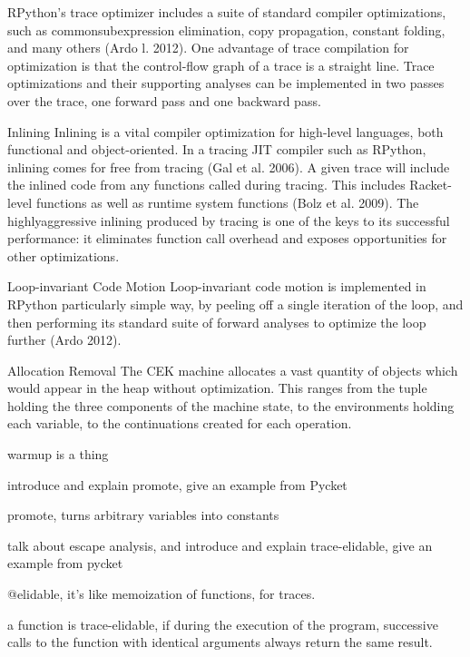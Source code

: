 RPython’s trace optimizer includes a suite of standard compiler optimizations, such as commonsubexpression elimination, copy propagation, constant folding, and many others (Ardo l. 2012). One advantage of trace compilation for optimization is that the control-flow graph of a trace is a straight line. Trace optimizations and their supporting analyses can be implemented in two passes over the trace, one forward pass and one backward pass.

Inlining Inlining is a vital compiler optimization for high-level languages, both functional and object-oriented. In a tracing JIT compiler such as RPython, inlining comes for free from tracing (Gal et al. 2006). A given trace will include the inlined code from any functions called during tracing. This includes Racket-level functions as well as runtime system functions (Bolz et al. 2009). The highlyaggressive inlining produced by tracing is one of the keys to its successful performance: it eliminates function call overhead and exposes opportunities for other optimizations.

Loop-invariant Code Motion Loop-invariant code motion is implemented in RPython particularly simple way, by peeling off a single iteration of the loop, and then performing its standard suite of forward analyses to optimize the loop further (Ardo 2012).

Allocation Removal The CEK machine allocates a vast quantity of objects which would appear in the heap without optimization. This ranges from the tuple holding the three components of the machine state, to the environments holding each variable, to the continuations created for each operation.

        \begin{paragraph-here}
            warmup is a thing
        \end{paragraph-here}

        \begin{paragraph-here}
            introduce and explain promote, give an example from Pycket

            promote, turns arbitrary variables into constants
        \end{paragraph-here}

        \begin{paragraph-here}
            talk about escape analysis, and introduce and explain trace-elidable, give an example from pycket

            @elidable, it's like memoization of functions, for traces.

            a function is trace-elidable, if during the execution of the program, successive calls to the function with identical arguments always return the same result.
        \end{paragraph-here}

